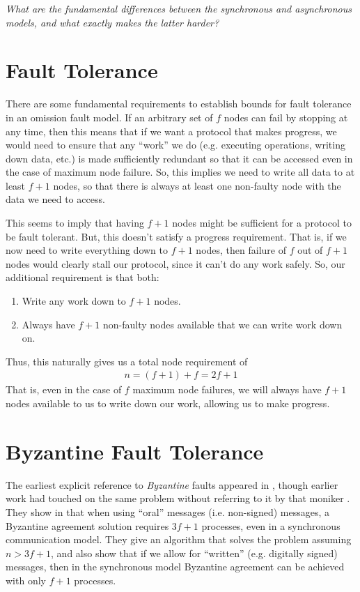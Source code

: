 \documentclass[10pt,a4paper]{article}
\begin{document}
\textit{What are the fundamental differences between the synchronous and asynchronous models, and what exactly makes the latter harder?}

\section{Fault Tolerance}

There are some fundamental requirements to establish bounds for fault tolerance in an omission fault model. If an arbitrary set of $f$ nodes can fail by stopping at any time, then this means that if we want a protocol that makes progress, we would need to ensure that any ``work'' we do (e.g. executing operations, writing down data, etc.) is made sufficiently redundant so that it can be accessed even in the case of maximum node failure. So, this implies we need to write all data to at least $f+1$ nodes, so that there is always at least one non-faulty node with the data we need to access. 

This seems to imply that having $f+1$ nodes might be sufficient for a protocol to be fault tolerant. But, this doesn't satisfy a progress requirement. That is, if we now need to write everything down to $f+1$ nodes, then failure of $f$ out of $f+1$ nodes would clearly stall our protocol, since it can't do any work safely. So, our additional requirement is that both: 
\begin{enumerate}[1)]
    \item Write any work down to $f+1$ nodes.
    \item Always have $f+1$ non-faulty nodes available that we can write work down on.
\end{enumerate}
Thus, this naturally gives us a total node requirement of 
\begin{align*}
    n = (f+1) + f = 2f + 1
\end{align*}
That is, even in the case of $f$ maximum node failures, we will always have $f+1$ nodes available to us to write down our work, allowing us to make progress.


\section{Byzantine Fault Tolerance}

The earliest explicit reference to \textit{Byzantine} faults appeared in \cite{1982lamportshostak}, though earlier work had touched on the same problem without referring to it by that moniker \cite{1980peasereaching,1978sift}. They show in \cite{1982lamportshostak} that when using ``oral'' messages (i.e. non-signed) messages, a Byzantine agreement solution requires $3f+1$ processes, even in a synchronous communication model. They give an algorithm that solves the problem assuming $n > 3f+1$, and also show that if we allow for ``written'' (e.g. digitally signed) messages, then in the synchronous model Byzantine agreement can be achieved with only $f+1$ processes.
\end{document}
